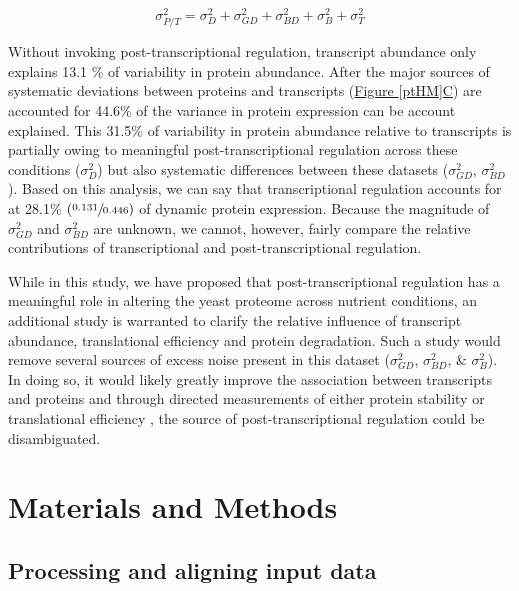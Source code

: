 \begin{equation}
\sigma^{2}_{P/T} = \sigma^{2}_{D} + \sigma^{2}_{GD} + \sigma^{2}_{BD} + \sigma^{2}_{B} + \sigma^{2}_{T}\label{eq:sources_of_ptvar}
\end{equation}

Without invoking post-transcriptional regulation, transcript abundance only explains 13.1 \% of variability in protein abundance. After the major sources of systematic deviations between proteins and transcripts (\hyperref[ptHM]{Figure \ref{ptHM}C}) are accounted for 44.6\% of the variance in protein expression can be account explained. This 31.5\% of variability in protein abundance relative to transcripts is partially owing to meaningful post-transcriptional regulation across these conditions ($\sigma^{2}_{D}$) but also systematic differences between these datasets ($\sigma^{2}_{GD}$, $\sigma^{2}_{BD}$). Based on this analysis, we can say that transcriptional regulation accounts for at 28.1\% $\left(\sfrac{0.131}{0.446}\right)$ of dynamic protein expression. Because the magnitude of $\sigma^{2}_{GD}$ and $\sigma^{2}_{BD}$ are unknown, we cannot, however, fairly compare the relative contributions of transcriptional and post-transcriptional regulation.

While in this study, we have proposed that post-transcriptional regulation has a meaningful role in altering the yeast proteome across nutrient conditions, an additional study is warranted to clarify the relative influence of transcript abundance, translational efficiency and protein degradation. Such a study would remove several sources of excess noise present in this dataset ($\sigma^{2}_{GD}$, $\sigma^{2}_{BD}$, $\&$ $\sigma^{2}_{B}$). In doing so, it would likely greatly improve the association between transcripts and proteins and through directed measurements of either protein stability or translational efficiency \cite{Belle:2006hv, Ingolia:2009dp}, the source of post-transcriptional regulation could be disambiguated.

\section{Materials and Methods}

\subsection{Processing and aligning input data}

